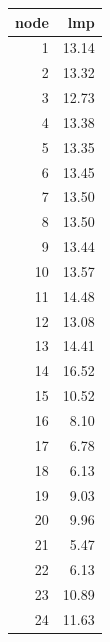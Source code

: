 \begin{tabular}{rr}
\toprule
node & lmp \\
\midrule
1 & 13.14 \\
2 & 13.32 \\
3 & 12.73 \\
4 & 13.38 \\
5 & 13.35 \\
6 & 13.45 \\
7 & 13.50 \\
8 & 13.50 \\
9 & 13.44 \\
10 & 13.57 \\
11 & 14.48 \\
12 & 13.08 \\
13 & 14.41 \\
14 & 16.52 \\
15 & 10.52 \\
16 & 8.10 \\
17 & 6.78 \\
18 & 6.13 \\
19 & 9.03 \\
20 & 9.96 \\
21 & 5.47 \\
22 & 6.13 \\
23 & 10.89 \\
24 & 11.63 \\
\bottomrule
\end{tabular}
